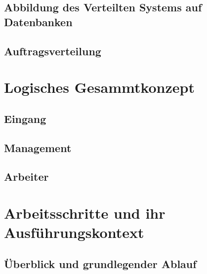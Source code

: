 \subsection{Abbildung des Verteilten Systems auf Datenbanken}




\subsection{Auftragsverteilung}

\section{Logisches Gesammtkonzept}
\subsection{Eingang}
\subsection{Management}
\subsection{Arbeiter}

\section{Arbeitsschritte und ihr Ausf\"uhrungskontext}

\subsection{\"Uberblick und grundlegender Ablauf}

